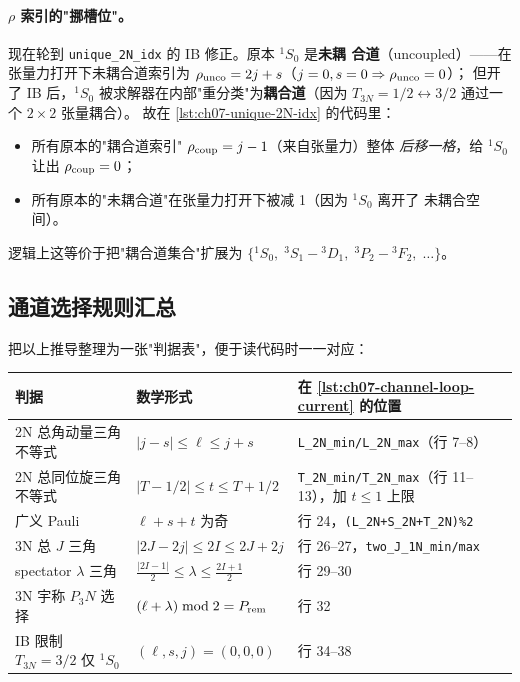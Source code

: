 \paragraph{\(\rho\) 索引的"挪槽位"。}
现在轮到 \texttt{unique\_2N\_idx} 的 IB 修正。原本 \({}^1S_0\) 是\textbf{未耦
合道}（uncoupled）——在张量力打开下未耦合道索引为
\(\rho_{\rm unco} = 2j + s\)（\(j=0, s=0 \Rightarrow \rho_{\rm unco}=0\)）；
但开了 IB 后，\({}^1S_0\) 被求解器在内部"重分类"为\textbf{耦合道}（因为
\(T_{3N} = 1/2 \leftrightarrow 3/2\) 通过一个 \(2 \times 2\) 张量耦合）。
故在
\cref{lst:ch07-unique-2N-idx} 的代码里：

\begin{itemize}
  \item 所有原本的"耦合道索引" \(\rho_{\rm coup} = j - 1\)（来自张量力）整体
        \emph{后移一格}，给 \({}^1S_0\) 让出 \(\rho_{\rm coup} = 0\)；
  \item 所有原本的"未耦合道"在张量力打开下被减 1（因为 \({}^1S_0\) 离开了
        未耦合空间）。
\end{itemize}

逻辑上这等价于把"耦合道集合"扩展为
\(\{{}^1S_0,\; {}^3S_1\!\!-\!{}^3D_1,\; {}^3P_2\!\!-\!{}^3F_2,\; \ldots\}\)。

\subsection{通道选择规则汇总}
\label{subsec:ch07-selection-rules}

把以上推导整理为一张"判据表"，便于读代码时一一对应：

\begin{center}
\begin{tabular}{p{3.6cm}p{4cm}p{6cm}}
\toprule
判据 & 数学形式 & 在 \cref{lst:ch07-channel-loop-current} 的位置 \\
\midrule
2N 总角动量三角不等式 & \(|j-s| \le \ell \le j+s\) & \verb|L_2N_min/L_2N_max|（行 7--8） \\
2N 总同位旋三角不等式 & \(|T-1/2| \le t \le T+1/2\) & \verb|T_2N_min/T_2N_max|（行 11--13），加 \(t \le 1\) 上限 \\
广义 Pauli & \(\ell + s + t\) 为奇 & 行 24，\verb|(L_2N+S_2N+T_2N)%2| \\
3N 总 \(J\) 三角 & \(|2J - 2j| \le 2I \le 2J + 2j\) & 行 26--27，\verb|two_J_1N_min/max| \\
spectator \(\lambda\) 三角 & \(\frac{|2I-1|}{2} \le \lambda \le \frac{2I+1}{2}\) & 行 29--30 \\
3N 宇称 \(P_3N\) 选择 & \((\ell + \lambda)\bmod 2 = P_{\rm rem}\) & 行 32 \\
IB 限制 \(T_{3N}=3/2\) 仅 \({}^1S_0\) & \((\ell, s, j) = (0,0,0)\) & 行 34--38 \\
\bottomrule
\end{tabular}
\end{center}

